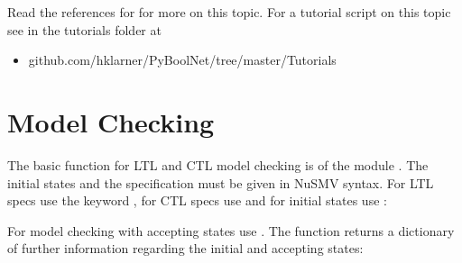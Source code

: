 \documentclass[letterpaper,10pt,english]{sphinxmanual}
\begin{document}
Read the references for {\hyperref[\detokenize{StateTransitionGraphs:statetransitiongraphs}]{}} for more on this topic.
For a tutorial script on this topic see  in the tutorials folder at
\begin{itemize}
\item {} 
github.com/hklarner/PyBoolNet/tree/master/Tutorials

\end{itemize}


\section{Model Checking}
\label{\detokenize{ManualQuick:model-checking}}
The basic function for LTL and CTL model checking is {\hyperref[\detokenize{ModelChecking:check-primes}]{}} of the module {\hyperref[\detokenize{ModelChecking:modelchecking}]{}}.
The initial states and the specification must be given in NuSMV syntax.
For LTL specs use the keyword , for CTL specs use  and for initial states use :

\begin{sphinxVerbatim}[commandchars=\\\{\}]
  
  
  
     
\end{sphinxVerbatim}

For model checking with accepting states use {\hyperref[\detokenize{ModelChecking:check-primes-with-acceptingstates}]{}}.
The function returns a dictionary of further information regarding the initial and accepting states:
\end{document}

